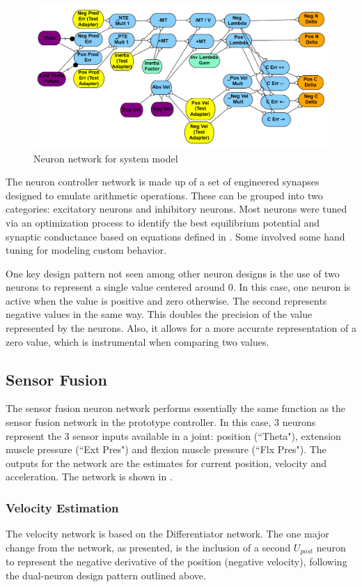 \documentclass[letterpaper, 10 pt, conference]{IEEEconf} %
\newcommand{\myref}[1]{\hyperref[#1]{\Cref{#1}}}
\newcommand{\bbss}[1]{\subsection{#1}}
\newcommand{\bbsss}[1]{\subsubsection{#1}}
\begin{document}
\begin{figure}
\centering
\includegraphics[width=6.5in]{methods/SystemModel_Test}
\caption{Neuron network for system model}
\label{fig:NeuronSystemModel}
\end{figure}

The neuron controller network is made up of a set of engineered synapses
designed to emulate arithmetic operations. These can be grouped into two
categories: excitatory neurons and inhibitory neurons. Most neurons were tuned
via an optimization process to identify the best equilibrium potential and
synaptic conductance based on equations defined in 
\cite{NickFunctionalSubnetwork}. Some involved some hand tuning for modeling custom behavior.

One key design pattern not seen among other neuron designs is the use of two
neurons to represent a single value centered around 0. In this case, one neuron 
is active when the value is positive and zero otherwise. The second represents 
negative values in the same way. This doubles the precision of the value 
represented by the neurons. Also, it allows for a more accurate representation of a zero value, which is instrumental when comparing two values.

\bbss{Sensor Fusion}

The sensor fusion neuron network performs essentially the same function as the
sensor fusion network in the prototype controller. In this case, 3 neurons
represent the 3 sensor inputs available in a joint: position (``Theta"),
extension muscle pressure (``Ext Pres") and flexion muscle pressure
(``Flx Pres"). The outputs for the network are the estimates for current 
position, velocity and acceleration. The network is shown in \myref{fig:NeuronSensorFusion}.

\bbsss{Velocity Estimation}

The velocity network is based on the Differentiator network. 
The one major change from the network,
as presented, is the inclusion of a second $U_{post}$ neuron to 
represent the negative derivative of the position (negative velocity), following the dual-neuron design pattern outlined above.
\end{document}
